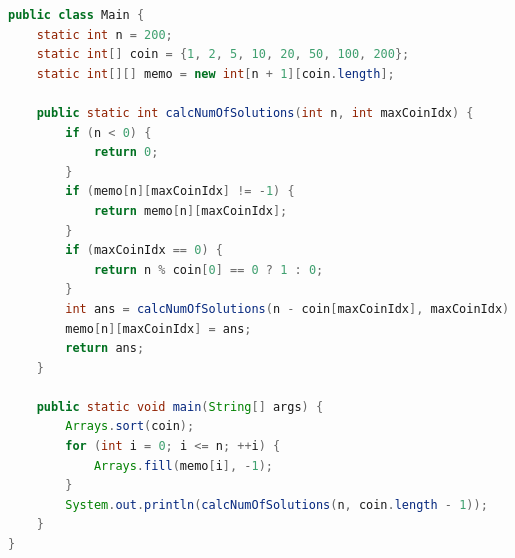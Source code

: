 \documentclass[12pt]{ctexart}
\begin{document}
\newpage
\begin{lstlisting}[language={java},caption={Algorithm 5}]
public class Main {
    static int n = 200;
    static int[] coin = {1, 2, 5, 10, 20, 50, 100, 200};
    static int[][] memo = new int[n + 1][coin.length];

    public static int calcNumOfSolutions(int n, int maxCoinIdx) {
        if (n < 0) {
            return 0;
        }
        if (memo[n][maxCoinIdx] != -1) {
            return memo[n][maxCoinIdx];
        }
        if (maxCoinIdx == 0) {
            return n % coin[0] == 0 ? 1 : 0;
        }
        int ans = calcNumOfSolutions(n - coin[maxCoinIdx], maxCoinIdx) + calcNumOfSolutions(n, maxCoinIdx - 1);
        memo[n][maxCoinIdx] = ans;
        return ans;
    }

    public static void main(String[] args) {
        Arrays.sort(coin);
        for (int i = 0; i <= n; ++i) {
            Arrays.fill(memo[i], -1);
        }
        System.out.println(calcNumOfSolutions(n, coin.length - 1));
    }
}
\end{lstlisting}
\end{document}
